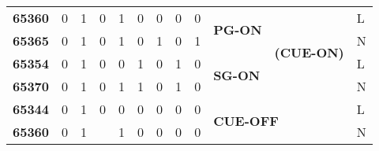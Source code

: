 \begin{table}[]
\begin{tabular}{|l|l|l|l|l|l|l|l|l|l|c|l|}
\textbf{65360}                                                  & 0             & 1                               & 0               & 1           & 0                                & 0                                & 0                                & 0                                & \multirow{2}{*}{\textbf{PG-ON}}                      & \multirow{4}{*}{\textbf{(CUE-ON)}} & L      \\ \cline{1-9} \cline{12-12} 
\textbf{65365}                                                  & 0             & 1                               & 0               & 1           & 0                                & 1                                & 0                                & 1                                &                                                      &                                    & N      \\ \cline{1-10} \cline{12-12} 
\textbf{65354}                                                  & 0             & 1                               & 0               & 0           & 1                                & 0                                & 1                                & 0                                & \multirow{2}{*}{\textbf{SG-ON}}                      &                                    & L      \\ \cline{1-9} \cline{12-12} 
\textbf{65370}                                                  & 0             & 1                               & 0               & 1           & 1                                & 0                                & 1                                & 0                                &                                                      &                                    & N      \\ \hline
\textbf{65344}                                                  & 0             & 1                               & 0               & 0           & 0                                & 0                                & 0                                & 0                                & \multicolumn{2}{l|}{\multirow{2}{*}{\textbf{CUE-OFF}}}                                    & L      \\ \cline{1-9} \cline{12-12} 
\textbf{65360}                                                  & 0             & 1                               &                 & 1           & 0                                & 0                                & 0                                & 0                                & \multicolumn{2}{l|}{}                                                                     & N      \\ \hline

\end{tabular}
\end{table}
